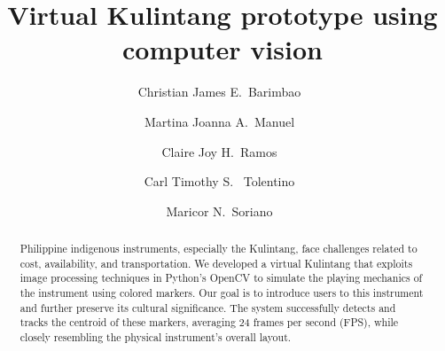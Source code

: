 \documentclass[10pt,a4paper,twoside]{article}
\begin{document}
\title{\TitleFont Virtual Kulintang prototype using computer vision}





 \author[1*]{Christian James E.~Barimbao~\authorsep}
 \author[1]{Martina Joanna A.~Manuel~\authorsep}
 \author[1]{Claire Joy H.~Ramos~\authorsep}
 \author[1]{Carl Timothy S. ~Tolentino~\authorsep}
 \author[2]{Maricor N.~Soriano~\lastauthorsep}


\begin{abstract}
\noindent
Philippine indigenous instruments, especially the Kulintang, face challenges related to cost, availability, and transportation. We developed a virtual Kulintang that exploits image processing techniques in Python's OpenCV to simulate the playing mechanics of the instrument using colored markers.  Our goal is to introduce users to this instrument and further preserve its cultural significance. The system successfully detects and tracks the centroid of these markers, averaging 24 frames per second (FPS), while closely resembling the physical instrument's overall layout. 


\end{abstract}
\end{document}
